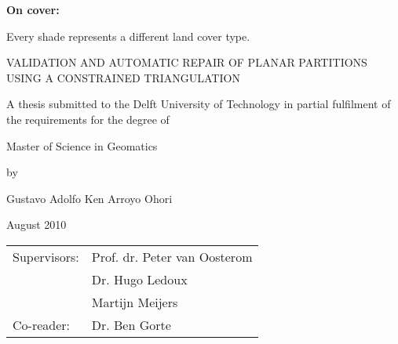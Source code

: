 \vspace*{1pt}
\vfill
\noindent
\textbf{On cover:}

\noindent

\noindent
Every shade represents a different land cover type.

\clearpage
\begin{center}
\Large
\vspace*{1cm}
VALIDATION AND AUTOMATIC REPAIR OF PLANAR PARTITIONS USING A CONSTRAINED TRIANGULATION

\large
\vspace{1cm}
A thesis submitted to the Delft University of Technology in partial fulfilment of the requirements for the degree of

\vspace{0.5cm}
Master of Science in Geomatics

\vspace{3cm}
by

\vspace{0.5cm}
Gustavo Adolfo Ken Arroyo Ohori

\vspace{0.5cm}
August 2010

\vfill
\begin{table*}[htpb]
	\begin{center}
	\large
	\begin{tabular}{@{}ll@{}}
	Supervisors: & Prof. dr. Peter van Oosterom \\
	& Dr. Hugo Ledoux \\
	& Martijn Meijers \\
	Co-reader: & Dr. Ben Gorte
	\end{tabular}
	\end{center}
\end{table*}

\end{center}